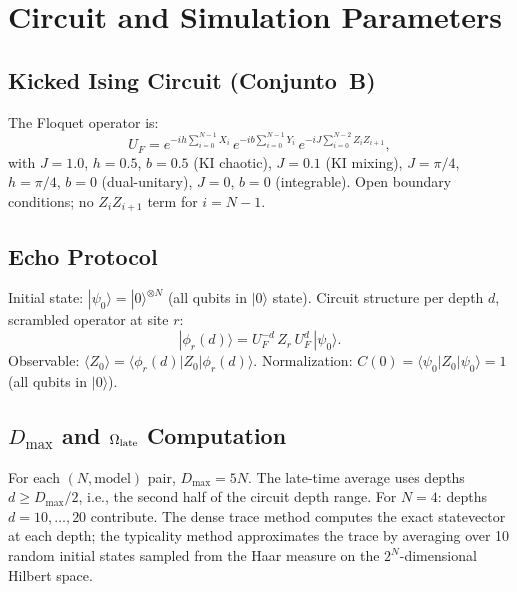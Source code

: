 \documentclass[twocolumn,showpacs,preprintnumbers,amsmath,amssymb,aps,prl]{revtex4-2}
\begin{document}
\section{Circuit and Simulation Parameters}

\subsection{Kicked Ising Circuit (Conjunto~B)}

The Floquet operator is:
\begin{equation}
  U_F = e^{-ih\sum_{i=0}^{N-1} X_i}\,
        e^{-ib\sum_{i=0}^{N-1} Y_i}\,
        e^{-iJ\sum_{i=0}^{N-2} Z_i Z_{i+1}},
\end{equation}
with $J=1.0$, $h=0.5$, $b=0.5$ (KI chaotic), $J=0.1$ (KI mixing),
$J=\pi/4$, $h=\pi/4$, $b=0$ (dual-unitary), $J=0$, $b=0$ (integrable). Open
boundary conditions; no $Z_i Z_{i+1}$ term for $i=N-1$.

\subsection{Echo Protocol}

Initial state: $|\psi_0\rangle = |0\rangle^{\otimes N}$ (all qubits in $|0\rangle$
state). Circuit structure per depth $d$, scrambled operator at site $r$:
\begin{equation}
  |\phi_r(d)\rangle = U_F^{-d}\,Z_r\,U_F^d\,|\psi_0\rangle.
\end{equation}
Observable: $\langle Z_0 \rangle = \langle \phi_r(d) | Z_0 | \phi_r(d) \rangle$.
Normalization: $C(0) = \langle\psi_0|Z_0|\psi_0\rangle = 1$ (all qubits in
$|0\rangle$).

\subsection{$D_{\max}$ and $\Omega_{\rm late}$ Computation}

For each $(N, \text{model})$ pair, $D_{\max} = 5N$. The late-time average uses
depths $d \geq D_{\max}/2$, i.e., the second half of the circuit depth range.
For $N=4$: depths $d = 10,\ldots,20$ contribute. The dense trace method computes
the exact statevector at each depth; the typicality method approximates the trace
by averaging over 10 random initial states sampled from the Haar measure on the
$2^N$-dimensional Hilbert space.
\end{document}
